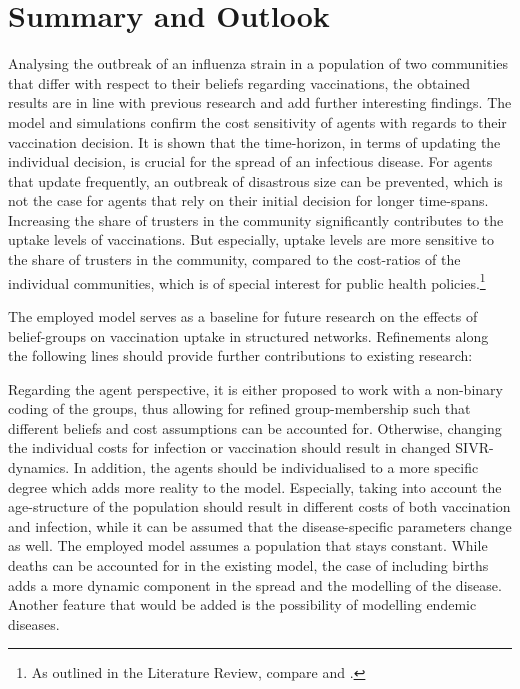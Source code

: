 \documentclass[11pt]{article}
\begin{document}
\section{Summary and Outlook}
\label{sec:SO}
Analysing the outbreak of an influenza strain in a population of two communities that differ with respect to their beliefs regarding vaccinations, the obtained results are in line with previous research and add further interesting findings. 
The model and simulations confirm the cost sensitivity of agents with regards to their vaccination decision. It is shown that the time-horizon, in terms of updating the individual decision, is crucial for the spread of an infectious disease. For agents that update frequently, an outbreak of disastrous size  can be prevented, which is not the case for agents that rely on their initial decision for longer time-spans. Increasing the share of trusters in the community significantly contributes to the uptake levels of vaccinations. But especially, uptake levels are more sensitive to the share of trusters in the community, compared to the cost-ratios of the individual communities, which is of special interest for public health policies.\footnote{As outlined in the Literature Review, compare \cite{shim2012} and \cite{Stegehuis2016}.} 

The employed model serves as a baseline for future research on the effects of belief-groups on vaccination uptake in structured networks. Refinements along the following lines should provide further contributions to existing research:  

Regarding the agent perspective, it is either proposed to work with a non-binary coding of the groups, thus allowing for refined group-membership such that different beliefs and cost assumptions can be accounted for. Otherwise, changing the individual costs for infection or vaccination should result in changed SIVR-dynamics. In addition, the agents should be individualised to a more specific degree which adds more reality to the model. Especially, taking into account the age-structure of the population should result in different costs of both vaccination and infection, while it can be assumed that the disease-specific parameters change as well. The employed model assumes a population that stays constant. While deaths can be accounted for in the existing model, the case of including births adds a more dynamic component in the spread and the modelling of the disease. Another feature that would be added is the possibility of modelling endemic diseases.
\end{document}
